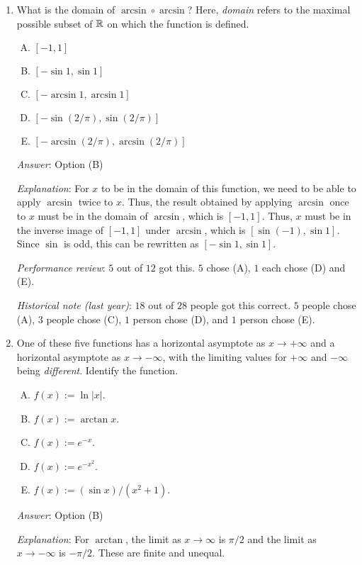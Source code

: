 \documentclass[10pt]{amsart}
\begin{document}
\begin{enumerate}
\item What is the domain of $\arcsin \circ \arcsin$? Here, {\em
  domain} refers to the maximal possible subset of $\mathbb{R}$ on which the
  function is defined.

  \begin{enumerate}[(A)]
  \item $[-1,1]$
  \item $[-\sin 1,\sin 1]$
  \item $[-\arcsin 1, \arcsin 1]$
  \item $[-\sin(2/\pi),\sin(2/\pi)]$
  \item $[-\arcsin(2/\pi),\arcsin(2/\pi)]$
  \end{enumerate}

  {\em Answer}: Option (B)

  {\em Explanation}: For $x$ to be in the domain of this function, we
  need to be able to apply $\arcsin$ twice to $x$. Thus, the result
  obtained by applying $\arcsin$ once to $x$ must be in the domain of
  $\arcsin$, which is $[-1,1]$. Thus, $x$ must be in the inverse image
  of $[-1,1]$ under $\arcsin$, which is $[\sin(-1),\sin 1]$. Since
  $\sin$ is odd, this can be rewritten as $[-\sin 1, \sin 1]$.

  {\em Performance review}: $5$ out of $12$ got this. $5$ chose (A),
  $1$ each chose (D) and (E).

  {\em Historical note (last year)}: $18$ out of $28$ people got this
  correct. $5$ people chose (A), $3$ people chose (C), $1$ person
  chose (D), and $1$ person chose (E).

\item One of these five functions has a horizontal asymptote as $x \to
  +\infty$ and a horizontal asymptote as $x \to -\infty$, with the
  limiting values for $+\infty$ and $-\infty$ being {\em
  different}. Identify the function. 

  \begin{enumerate}[(A)]
  \item $f(x) := \ln|x|$.
  \item $f(x) := \arctan x$.
  \item $f(x) := e^{-x}$.
  \item $f(x) := e^{-x^2}$.
  \item $f(x) := (\sin x)/(x^2 + 1)$.
  \end{enumerate}

  {\em Answer}: Option (B)

  {\em Explanation}: For $\arctan$, the limit as $x \to \infty$ is
  $\pi/2$ and the limit as $x \to -\infty$ is $-\pi/2$. These are
  finite and unequal.


\end{enumerate}
\end{document}

